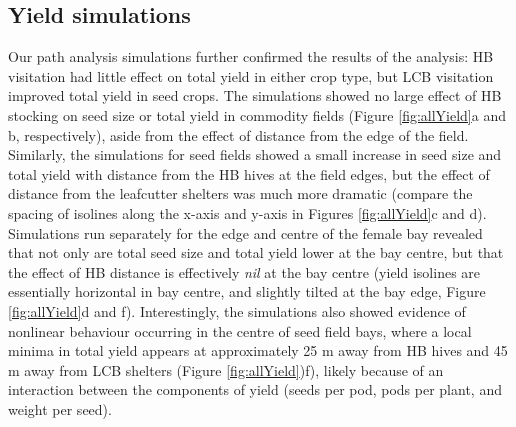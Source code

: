 \documentclass[12pt]{article} %
\begin{document}
\subsection*{Yield simulations}

Our path analysis simulations further confirmed the results of the analysis: HB visitation had little effect on total yield in either crop type, but LCB visitation improved total yield in seed crops.
The simulations showed no large effect of HB stocking on seed size or total yield in commodity fields (Figure \ref{fig:allYield}a and b, respectively), aside from the effect of distance from the edge of the field.
Similarly, the simulations for seed fields showed a small increase in seed size and total yield with distance from the HB hives at the field edges, but the effect of distance from the leafcutter shelters was much more dramatic (compare the spacing of isolines along the x-axis and y-axis in Figures \ref{fig:allYield}c and d).
Simulations run separately for the edge and centre of the female bay revealed that not only are total seed size and total yield lower at the bay centre, but that the effect of HB distance is effectively \emph{nil} at the bay centre (yield isolines are essentially horizontal in bay centre, and slightly tilted at the bay edge, Figure \ref{fig:allYield}d and f).
Interestingly, the simulations also showed evidence of nonlinear behaviour occurring in the centre of seed field bays, where a local minima in total yield appears at approximately 25 m away from HB hives and 45 m away from LCB shelters (Figure \ref{fig:allYield})f), likely because of an interaction between the components of yield (seeds per pod, pods per plant, and weight per seed). 
\end{document}

